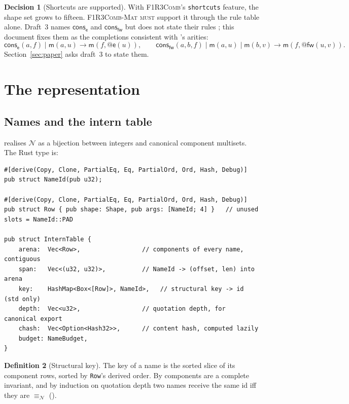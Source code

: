 \documentclass[11pt,a4paper]{article}
\makeatletter
\newcommand{\code}[1]{\texttt{#1}}
\newcommand{\Comb}{\textsc{F1R3Comb}}
\newcommand{\Mat}{\textsc{F1R3Comb-Mat}}
\newcommand{\MUST}{\textsc{must}}
\newcommand{\quo}[1]{@#1}
\newcommand{\nequiv}{\equiv_{\mathcal{N}}}
\newcommand{\red}{\longrightarrow}
\newcommand{\mm}{\mathsf{m}}
\newcommand{\fw}{\mathsf{fw}}
\newcommand{\ev}{\mathsf{e}}
\newcommand{\conse}{\mathsf{cons}_{\ev}}
\newcommand{\consf}{\mathsf{cons}_{\fw}}
\newcommand{\Nm}{\mathcal{N}}
\theoremstyle{definition}
\newtheorem{definition}{Definition}[section]
\newtheorem{decision}[definition]{Decision}
\theoremstyle{plain}
\makeatother
\begin{document}
\begin{decision}[Shortcuts are supported]\label{dec:shortcuts}
With \Comb's \code{shortcuts} feature, the shape set grows to fifteen. \Mat{}
\MUST{} support it through the rule table alone. Draft~3 names
$\conse$ and $\consf$ but does not state their rules
\cite[Rem.~3.10, Rem.~6.7]{draft3}; this document fixes them as the
completions consistent with \cite[Req.~7.12]{combspec}'s arities:
\[
\conse(a,f) \mid \mm(a,u) \red \mm(f,\quo{\ev(u)}),
\qquad
\consf(a,b,f) \mid \mm(a,u) \mid \mm(b,v) \red \mm(f,\quo{\fw(u,v)}).
\]
Section~\ref{sec:paper} asks draft~3 to state them.
\end{decision}

\section{The representation}\label{sec:rep}

\subsection{Names and the intern table}

\cite[Def.~4.3]{matnote} realises $\Nm$ as a bijection between integers and
canonical component multisets. The Rust type is:

\begin{lstlisting}
#[derive(Copy, Clone, PartialEq, Eq, PartialOrd, Ord, Hash, Debug)]
pub struct NameId(pub u32);

#[derive(Copy, Clone, PartialEq, Eq, PartialOrd, Ord, Hash, Debug)]
pub struct Row { pub shape: Shape, pub args: [NameId; 4] }   // unused slots = NameId::PAD

pub struct InternTable {
    arena:  Vec<Row>,                 // components of every name, contiguous
    span:   Vec<(u32, u32)>,          // NameId -> (offset, len) into arena
    key:    HashMap<Box<[Row]>, NameId>,   // structural key -> id (std only)
    depth:  Vec<u32>,                 // quotation depth, for canonical export
    chash:  Vec<Option<Hash32>>,      // content hash, computed lazily
    budget: NameBudget,
}
\end{lstlisting}

\begin{definition}[Structural key]\label{def:skey}
The key of a name is the sorted slice of its component rows, sorted by
\code{Row}'s derived order. By \cite[Def.~2.9]{logic} components are a
complete invariant, and by induction on quotation depth two names receive the
same id iff they are $\nequiv$ (\cite[Prop.~2.10]{logic}).
\end{definition}
\end{document}
